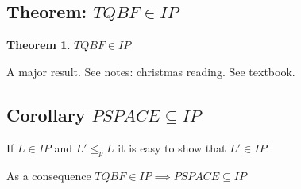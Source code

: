 \documentclass[a4paper,12pt]{article}
\theoremstyle{definition}
\newtheorem{theorem}[counter]{Theorem}
\theoremstyle{remark}
\begin{document}
\subsection{Theorem: $TQBF \in IP$}
\begin{theorem}
    $TQBF \in IP$
\end{theorem}
A major result. See notes: christmas reading. See textbook.
\subsection*{Corollary $PSPACE \subseteq IP$}
If $L \in IP$ and $L' \leq_p L$ it is easy to show that $L' \in IP$.

As a consequence $TQBF \in IP \implies PSPACE \subseteq IP$


\end{document}
